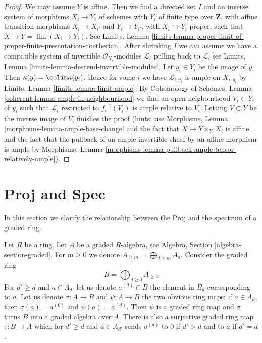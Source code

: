 \begin{proof}
We may assume $Y$ is affine. Then we find a directed set $I$
and an inverse system of morphisms $X_i \to Y_i$ of schemes
with $Y_i$ of finite type over $\mathbf{Z}$, with affine
transition morphisms $X_i \to X_{i'}$ and $Y_i \to Y_{i'}$,
with $X_i \to Y_i$ proper, such that $X \to Y = \lim (X_i \to Y_i)$.
See Limits, Lemma
\ref{limits-lemma-proper-limit-of-proper-finite-presentation-noetherian}.
After shrinking $I$ we can assume we have a compatible system of
invertible $\mathcal{O}_{X_i}$-modules $\mathcal{L}_i$
pulling back to $\mathcal{L}$, see
Limits, Lemma \ref{limits-lemma-descend-invertible-modules}.
Let $y_i \in Y_i$ be the image of $y$.
Then $\kappa(y) = \colim \kappa(y_i)$.
Hence for some $i$ we have $\mathcal{L}_{i, y_i}$
is ample on $X_{i, y_i}$ by
Limits, Lemma \ref{limits-lemma-limit-ample}.
By Cohomology of Schemes, Lemma \ref{coherent-lemma-ample-in-neighbourhood}
we find an open neigbourhood
$V_i \subset Y_i$ of $y_i$ such that
$\mathcal{L}_i$ restricted to $f_i^{-1}(V_i)$
is ample relative to $V_i$.
Letting $V \subset Y$ be the inverse image of
$V_i$ finishes the proof (hints: use
Morphisms, Lemma \ref{morphisms-lemma-ample-base-change} and
the fact that $X \to Y \times_{Y_i} X_i$ is affine
and the fact that the pullback of an
ample invertible sheaf by an affine morphism is ample by
Morphisms, Lemma \ref{morphisms-lemma-pullback-ample-tensor-relatively-ample}).
\end{proof}







\section{Proj and Spec}
\label{section-proj-spec}

\noindent
In this section we clarify the relationship between the Proj and the spectrum
of a graded ring.

\medskip\noindent
Let $R$ be a ring. Let $A$ be a graded $R$-algebra, see
Algebra, Section \ref{algebra-section-graded}.
For $m \geq 0$ we denote $A_{\geq m} = \bigoplus_{d \geq m} A_d$.
Consider the graded ring
$$
B = \bigoplus\nolimits_{d \geq 0} A_{\geq d}
$$
For $d' \geq d$ and $a \in A_{d'}$ let us denote $a^{(d)} \in B$
the element in $B_d$ corresponding to $a$.
Let us denote $\sigma : A \to B$ and $\psi : A \to B$
the two obvious ring maps: if $a \in A_d$, then
$\sigma(a) = a^{(0)}$ and $\psi(a) = a^{(d)}$.
Then $\psi$ is a graded ring map and $\sigma$ turns $B$
into a graded algebra over $A$. There is also a
surjective graded ring map $\tau : B \to A$
which for $d' \geq d$ and $a \in A_{d'}$ sends
$a^{(d)}$ to $0$ if $d' > d$ and to $a$ if $d' = d$.

